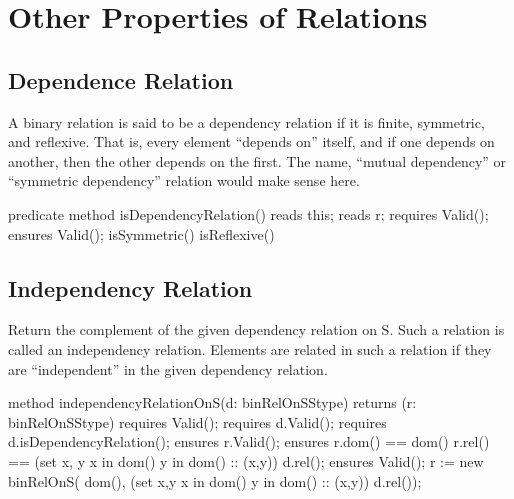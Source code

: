 \documentclass[letterpaper,10pt,english]{sphinxmanual}
\begin{document}
\section{Other Properties of Relations}
\label{\detokenize{08-relations:other-properties-of-relations}}

\subsection{Dependence Relation}
\label{\detokenize{08-relations:dependence-relation}}
A binary relation is said to be a dependency relation if it is finite,
symmetric, and reflexive. That is, every element “depends on” itself,
and if one depends on another, then the other depends on the
first. The name, “mutual dependency” or “symmetric dependency”
relation would make sense here.

\begin{sphinxVerbatim}[commandchars=\\\{\}]
predicate method isDependencyRelation()
    reads this;
    reads r;
    requires Valid();
    ensures Valid();
\PYGZob{}
    isSymmetric() \PYGZam{}\PYGZam{} isReflexive()
\PYGZcb{}
\end{sphinxVerbatim}


\subsection{Independency Relation}
\label{\detokenize{08-relations:independency-relation}}
Return the complement of the given dependency relation on S. Such a
relation is called an independency relation. Elements are related in
such a relation if they are “independent” in the given dependency
relation.

\begin{sphinxVerbatim}[commandchars=\\\{\}]
method independencyRelationOnS(d: binRelOnS\PYGZlt{}Stype\PYGZgt{})
    returns (r: binRelOnS\PYGZlt{}Stype\PYGZgt{})
    requires Valid();
    requires d.Valid();
    requires d.isDependencyRelation();
    ensures r.Valid();
    ensures r.dom() == dom() \PYGZam{}\PYGZam{}
            r.rel() ==
                (set x, y \textbar{} x in dom() \PYGZam{}\PYGZam{} y in dom() :: (x,y)) \PYGZhy{}
                d.rel();
    ensures Valid();
\PYGZob{}
    r := new binRelOnS(
        dom(),
        (set x,y \textbar{} x in dom() \PYGZam{}\PYGZam{} y in dom() :: (x,y)) \PYGZhy{} d.rel());
\PYGZcb{}
\end{sphinxVerbatim}
\end{document}
